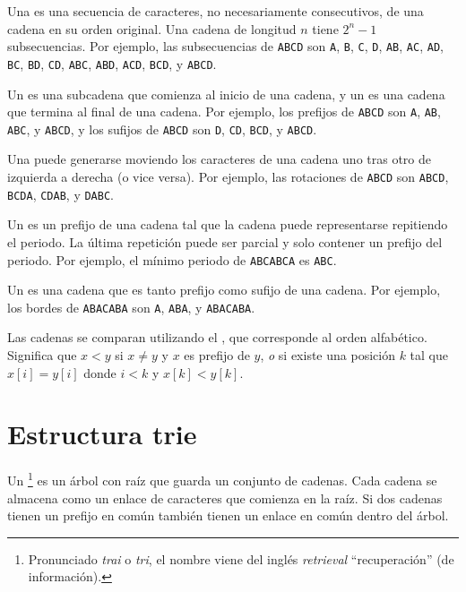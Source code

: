 
Una  es una secuencia de caracteres, no necesariamente
consecutivos, de una cadena en su orden original. Una cadena de
longitud $n$ tiene $2^n-1$ subsecuencias. Por ejemplo, las subsecuencias
de \texttt{ABCD} son
\texttt{A}, \texttt{B}, \texttt{C}, \texttt{D},
\texttt{AB}, \texttt{AC}, \texttt{AD},
\texttt{BC}, \texttt{BD}, \texttt{CD},
\texttt{ABC}, \texttt{ABD}, \texttt{ACD},
\texttt{BCD}, y \texttt{ABCD}.


Un  es una subcadena que comienza al inicio de una cadena,
y un  es una cadena que termina al final de una cadena. Por
ejemplo, los prefijos de \texttt{ABCD} son
\texttt{A}, \texttt{AB}, \texttt{ABC}, y \texttt{ABCD},
y los sufijos de \texttt{ABCD} son
\texttt{D}, \texttt{CD}, \texttt{BCD}, y \texttt{ABCD}.


Una  puede generarse moviendo los caracteres de una
cadena uno tras otro de izquierda a derecha (o vice versa).
Por ejemplo, las rotaciones de \texttt{ABCD} son
\texttt{ABCD}, \texttt{BCDA}, \texttt{CDAB}, y \texttt{DABC}.


Un  es un prefijo de una cadena tal que la cadena puede
representarse repitiendo el periodo. La última repetición puede ser
parcial y solo contener un prefijo del periodo. Por ejemplo, el
mínimo periodo de \texttt{ABCABCA} es \texttt{ABC}.


Un  es una cadena que es tanto prefijo como sufijo de una
cadena. Por ejemplo, los bordes de \texttt{ABACABA} son \texttt{A},
\texttt{ABA}, y \texttt{ABACABA}.


Las cadenas se comparan utilizando el ,
que corresponde al orden alfabético. Significa que $x<y$ si $x \neq y$ y
$x$ es prefijo de $y$, \emph{o} si existe una posición $k$ tal que
$x[i]=y[i]$ donde $i<k$ y $x[k]<y[k]$.

\section{Estructura trie}


Un \footnote{Pronunciado \textit{trai} o \textit{tri}, el nombre
    viene del inglés \textit{retrieval} ``recuperación'' (de información).}
es un árbol con raíz que guarda un conjunto de cadenas. Cada cadena se
almacena como un enlace de caracteres que comienza en la raíz. Si dos
cadenas tienen un prefijo en común también tienen un enlace en común
dentro del árbol.

